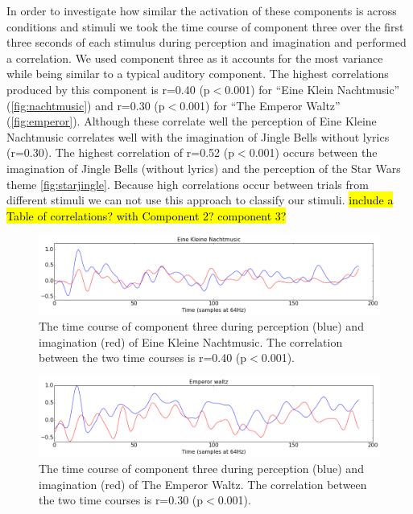 In order to investigate how similar the activation of these components is across conditions and stimuli we took the time course of component three over the first three seconds of each stimulus during perception and imagination and performed a correlation.
We used component three as it accounts for the most variance while being similar to a typical auditory component.
The highest correlations produced by this component is r=0.40 (p$<$0.001) for ``Eine Klein Nachtmusic'' (\autoref{fig:nachtmusic}) and r=0.30 (p$<$0.001) for ``The Emperor Waltz'' (\autoref{fig:emperor}).
Although these correlate well the perception of Eine Kleine Nachtmusic correlates well with the imagination of Jingle Bells without lyrics (r=0.30). 
The highest correlation of r=0.52 (p$<$0.001) occurs between the imagination of Jingle Bells (without lyrics) and the perception of the Star Wars theme \autoref{fig:starjingle}. 
Because high correlations occur between trials from different stimuli we can not use this approach to classify our stimuli.
\hl{include a Table of correlations? with Component 2? component 3?}


\begin{figure}[t]
  \begin{center}
    \includegraphics[scale=0.4]{Figures/EineKleineCorrelation}
    \caption{
The time course of component three during perception (blue) and imagination (red) of Eine Kleine Nachtmusic. The correlation between the two time courses is r=0.40 (p$<$0.001).
}
    \label{fig:nachtmusic}
  \end{center}
\end{figure}

\begin{figure}[t]
  \begin{center}
    \includegraphics[scale=0.4]{Figures/EmperorCorrelation}
    \caption{
The time course of component three during perception (blue) and imagination (red) of The Emperor Waltz. The correlation between the two time courses is r=0.30 (p$<$0.001).
}
    \label{fig:emperor}
  \end{center}
\end{figure}

